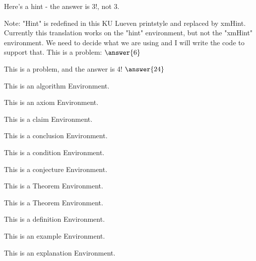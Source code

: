 \documentclass{ximera}
\begin{document}
\begin{exercise}
    \begin{hint}
        Here's a hint - the answer is 3!, not 3.
    \end{hint}
    Note: "Hint" is redefined in this KU Lueven printstyle and replaced by xmHint. Currently this translation works on the "hint" environment, but not the "xmHint" environment. We need to decide what we are using and I will write the code to support that.
    This is a problem: $\answer{6}$
\end{exercise}

\begin{exploration}
    This is a problem, and the answer is 4! $\answer{24}$
\end{exploration}
\begin{algorithm}
    This is an algorithm Environment.
\end{algorithm}%
\begin{axiom}
    This is an axiom Environment.
\end{axiom}%
\begin{claim}
    This is a claim Environment.
\end{claim}%
\begin{conclusion}
    This is a conclusion Environment.
\end{conclusion}%
\begin{condition}
    This is a condition Environment.
\end{condition}%
\begin{conjecture}
    This is a conjecture Environment.
\end{conjecture}%
\begin{corollary}
    This is a Theorem Environment.
\end{corollary}%
\begin{criterion}
    This is a Theorem Environment.
\end{criterion}%
\begin{definition}
    This is a definition Environment.
\end{definition}%
\begin{example}
    This is an example Environment.
\end{example}%
\begin{explanation}
    This is an explanation Environment.
\end{explanation}%
\end{document}
